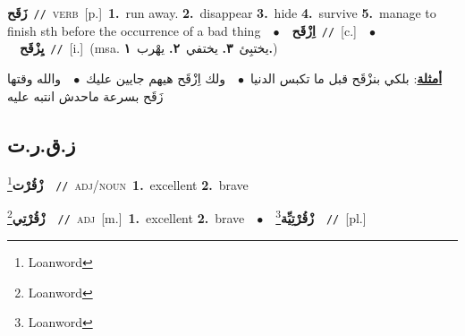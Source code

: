 \documentclass[10pt,a4paper,twoside]{article} %
\begin{document}
\begin{multicols}{2}
{\setlength\topsep{0pt}\textbf{\foreignlanguage{arabic}{زَقَح}}\ {\color{gray}\texttt{//}\color{black}}\ \textsc{verb}\ [p.]\ \textbf{1.}~run away.  \textbf{2.}~disappear  \textbf{3.}~hide  \textbf{4.}~survive  \textbf{5.}~manage to finish sth before the occurrence of a bad thing\ \ $\bullet$\ \ \setlength\topsep{0pt}\textbf{\foreignlanguage{arabic}{اِزْقَح}}\ {\color{gray}\texttt{//}\color{black}}\ [c.]\ \ $\bullet$\ \ \setlength\topsep{0pt}\textbf{\foreignlanguage{arabic}{يِزْقَح}}\ {\color{gray}\texttt{//}\color{black}}\ [i.]\ \color{gray}(msa. \foreignlanguage{arabic}{يختبِئ}~\foreignlanguage{arabic}{\textbf{٣.}}  \foreignlanguage{arabic}{يختفي}~\foreignlanguage{arabic}{\textbf{٢.}}  \foreignlanguage{arabic}{يهْرب}~\foreignlanguage{arabic}{\textbf{١.}})\color{black}\  \begin{flushright}\color{gray}\foreignlanguage{arabic}{\textbf{\underline{\foreignlanguage{arabic}{أمثلة}}}: بلكي بنزْقَح قبل ما تكبس الدنيا\ $\bullet$\ \  ولك اِزْقَح هيهم جايين عليك\ $\bullet$\ \  والله وقتها زَقَح بسرعة ماحدش انتبه عليه}\end{flushright}\color{black}} \vspace{2mm}

\vspace{-3mm}
\subsection*{\color{blue}\foreignlanguage{arabic}{ز.ق.ر.ت}\color{blue}{}} 

{\setlength\topsep{0pt}\textbf{\foreignlanguage{arabic}{زْقُرْت}}\footnote{Loanword}\ \ {\color{gray}\texttt{//}\color{black}}\ \textsc{adj/noun}\ \textbf{1.}~excellent  \textbf{2.}~brave\ } \vspace{2mm}

{\setlength\topsep{0pt}\textbf{\foreignlanguage{arabic}{زْقُرْتِي}}\footnote{Loanword}\ \ {\color{gray}\texttt{//}\color{black}}\ \textsc{adj}\ [m.]\ \textbf{1.}~excellent  \textbf{2.}~brave\ \ $\bullet$\ \ \setlength\topsep{0pt}\textbf{\foreignlanguage{arabic}{زْقُرْتِيِّة}}\footnote{Loanword}\ \ {\color{gray}\texttt{//}\color{black}}\ [pl.]\ } \vspace{2mm}


\end{multicols}
\end{document}

